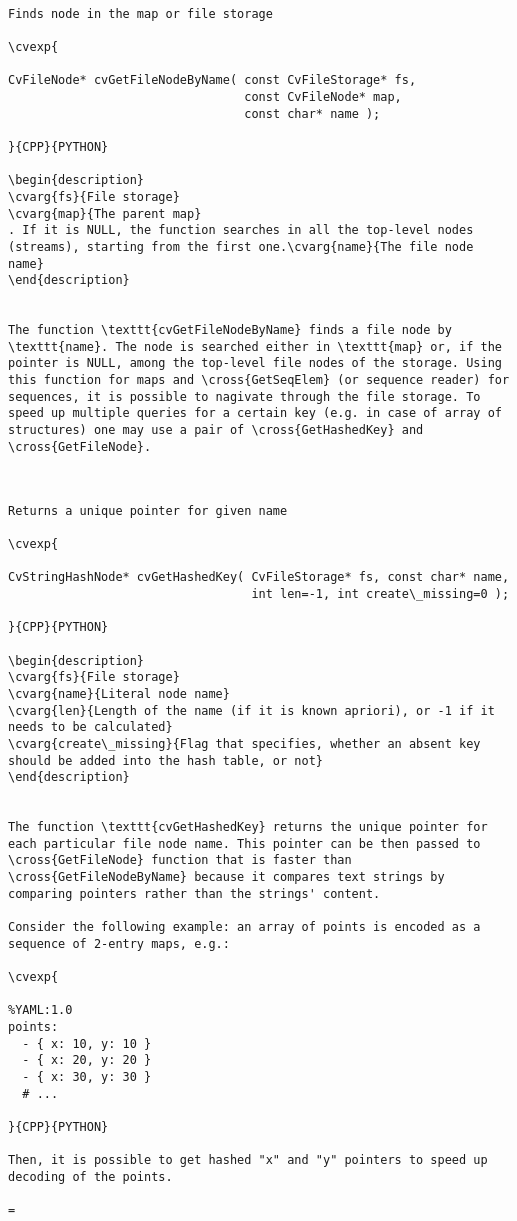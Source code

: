 \begin{verbatim}

Finds node in the map or file storage

\cvexp{

CvFileNode* cvGetFileNodeByName( const CvFileStorage* fs,
                                 const CvFileNode* map,
                                 const char* name );

}{CPP}{PYTHON}

\begin{description}
\cvarg{fs}{File storage}
\cvarg{map}{The parent map}
. If it is NULL, the function searches in all the top-level nodes (streams), starting from the first one.\cvarg{name}{The file node name}
\end{description}


The function \texttt{cvGetFileNodeByName} finds a file node by \texttt{name}. The node is searched either in \texttt{map} or, if the pointer is NULL, among the top-level file nodes of the storage. Using this function for maps and \cross{GetSeqElem} (or sequence reader) for sequences, it is possible to nagivate through the file storage. To speed up multiple queries for a certain key (e.g. in case of array of structures) one may use a pair of \cross{GetHashedKey} and \cross{GetFileNode}.


\end{verbatim}
\begin{verbatim}

Returns a unique pointer for given name

\cvexp{

CvStringHashNode* cvGetHashedKey( CvFileStorage* fs, const char* name,
                                  int len=-1, int create\_missing=0 );

}{CPP}{PYTHON}

\begin{description}
\cvarg{fs}{File storage}
\cvarg{name}{Literal node name}
\cvarg{len}{Length of the name (if it is known apriori), or -1 if it needs to be calculated}
\cvarg{create\_missing}{Flag that specifies, whether an absent key should be added into the hash table, or not}
\end{description}


The function \texttt{cvGetHashedKey} returns the unique pointer for each particular file node name. This pointer can be then passed to \cross{GetFileNode} function that is faster than \cross{GetFileNodeByName} because it compares text strings by comparing pointers rather than the strings' content.

Consider the following example: an array of points is encoded as a sequence of 2-entry maps, e.g.:

\cvexp{

%YAML:1.0
points:
  - { x: 10, y: 10 }
  - { x: 20, y: 20 }
  - { x: 30, y: 30 }
  # ...

}{CPP}{PYTHON}

Then, it is possible to get hashed "x" and "y" pointers to speed up decoding of the points.

=\end{verbatim}

